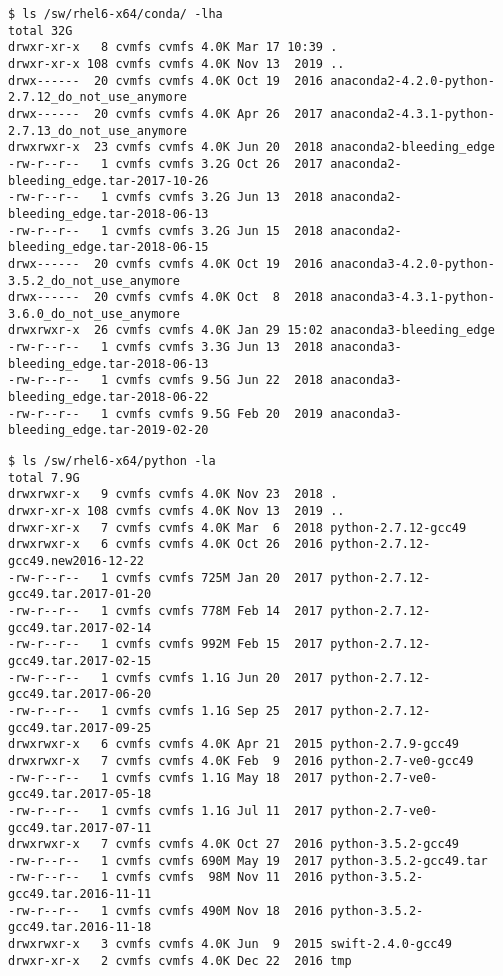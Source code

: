 \begin{verbatim}
$ ls /sw/rhel6-x64/conda/ -lha
total 32G
drwxr-xr-x   8 cvmfs cvmfs 4.0K Mar 17 10:39 .
drwxr-xr-x 108 cvmfs cvmfs 4.0K Nov 13  2019 ..
drwx------  20 cvmfs cvmfs 4.0K Oct 19  2016 anaconda2-4.2.0-python-2.7.12_do_not_use_anymore
drwx------  20 cvmfs cvmfs 4.0K Apr 26  2017 anaconda2-4.3.1-python-2.7.13_do_not_use_anymore
drwxrwxr-x  23 cvmfs cvmfs 4.0K Jun 20  2018 anaconda2-bleeding_edge
-rw-r--r--   1 cvmfs cvmfs 3.2G Oct 26  2017 anaconda2-bleeding_edge.tar-2017-10-26
-rw-r--r--   1 cvmfs cvmfs 3.2G Jun 13  2018 anaconda2-bleeding_edge.tar-2018-06-13
-rw-r--r--   1 cvmfs cvmfs 3.2G Jun 15  2018 anaconda2-bleeding_edge.tar-2018-06-15
drwx------  20 cvmfs cvmfs 4.0K Oct 19  2016 anaconda3-4.2.0-python-3.5.2_do_not_use_anymore
drwx------  20 cvmfs cvmfs 4.0K Oct  8  2018 anaconda3-4.3.1-python-3.6.0_do_not_use_anymore
drwxrwxr-x  26 cvmfs cvmfs 4.0K Jan 29 15:02 anaconda3-bleeding_edge
-rw-r--r--   1 cvmfs cvmfs 3.3G Jun 13  2018 anaconda3-bleeding_edge.tar-2018-06-13
-rw-r--r--   1 cvmfs cvmfs 9.5G Jun 22  2018 anaconda3-bleeding_edge.tar-2018-06-22
-rw-r--r--   1 cvmfs cvmfs 9.5G Feb 20  2019 anaconda3-bleeding_edge.tar-2019-02-20
\end{verbatim}

\begin{verbatim}
$ ls /sw/rhel6-x64/python -la
total 7.9G
drwxrwxr-x   9 cvmfs cvmfs 4.0K Nov 23  2018 .
drwxr-xr-x 108 cvmfs cvmfs 4.0K Nov 13  2019 ..
drwxr-xr-x   7 cvmfs cvmfs 4.0K Mar  6  2018 python-2.7.12-gcc49
drwxrwxr-x   6 cvmfs cvmfs 4.0K Oct 26  2016 python-2.7.12-gcc49.new2016-12-22
-rw-r--r--   1 cvmfs cvmfs 725M Jan 20  2017 python-2.7.12-gcc49.tar.2017-01-20
-rw-r--r--   1 cvmfs cvmfs 778M Feb 14  2017 python-2.7.12-gcc49.tar.2017-02-14
-rw-r--r--   1 cvmfs cvmfs 992M Feb 15  2017 python-2.7.12-gcc49.tar.2017-02-15
-rw-r--r--   1 cvmfs cvmfs 1.1G Jun 20  2017 python-2.7.12-gcc49.tar.2017-06-20
-rw-r--r--   1 cvmfs cvmfs 1.1G Sep 25  2017 python-2.7.12-gcc49.tar.2017-09-25
drwxrwxr-x   6 cvmfs cvmfs 4.0K Apr 21  2015 python-2.7.9-gcc49
drwxrwxr-x   7 cvmfs cvmfs 4.0K Feb  9  2016 python-2.7-ve0-gcc49
-rw-r--r--   1 cvmfs cvmfs 1.1G May 18  2017 python-2.7-ve0-gcc49.tar.2017-05-18
-rw-r--r--   1 cvmfs cvmfs 1.1G Jul 11  2017 python-2.7-ve0-gcc49.tar.2017-07-11
drwxrwxr-x   7 cvmfs cvmfs 4.0K Oct 27  2016 python-3.5.2-gcc49
-rw-r--r--   1 cvmfs cvmfs 690M May 19  2017 python-3.5.2-gcc49.tar
-rw-r--r--   1 cvmfs cvmfs  98M Nov 11  2016 python-3.5.2-gcc49.tar.2016-11-11
-rw-r--r--   1 cvmfs cvmfs 490M Nov 18  2016 python-3.5.2-gcc49.tar.2016-11-18
drwxrwxr-x   3 cvmfs cvmfs 4.0K Jun  9  2015 swift-2.4.0-gcc49
drwxr-xr-x   2 cvmfs cvmfs 4.0K Dec 22  2016 tmp
\end{verbatim}
